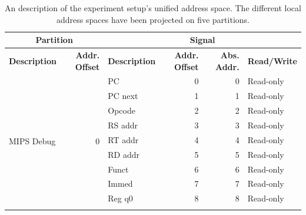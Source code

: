 \documentclass{article}
\begin{document}
\begin{table}[]
\centering
\caption{An description of the experiment setup's unified address space. The different local address spaces have been projected on five partitions.}
\label{tbl:address-space}
\begin{tabular}{|l|r|l|r|r|l|}
\hline
\multicolumn{2}{|c|}{\textbf{Partition}}                     & \multicolumn{4}{c|}{\textbf{Signal}}                                                     \\ \hline
\textbf{Description}                & \textbf{Addr. Offset}  & \textbf{Description} & \textbf{Addr. Offset} & \textbf{Abs. Addr.} & \textbf{Read/Write} \\ \hline
\multirow{18}{*}{MIPS Debug}        & \multirow{18}{*}{0}    & PC                   & 0                     & 0                   & Read-only           \\ \cline{3-6} 
                                    &                        & PC next              & 1                     & 1                   & Read-only           \\ \cline{3-6} 
                                    &                        & Opcode               & 2                     & 2                   & Read-only           \\ \cline{3-6} 
                                    &                        & RS addr              & 3                     & 3                   & Read-only           \\ \cline{3-6} 
                                    &                        & RT addr              & 4                     & 4                   & Read-only           \\ \cline{3-6} 
                                    &                        & RD addr              & 5                     & 5                   & Read-only           \\ \cline{3-6} 
                                    &                        & Funct                & 6                     & 6                   & Read-only           \\ \cline{3-6} 
                                    &                        & Immed                & 7                     & 7                   & Read-only           \\ \cline{3-6} 
                                    &                        & Reg q0               & 8                     & 8                   & Read-only           \\ \cline{3-6} 

\end{tabular}
\end{table}
\end{document}
